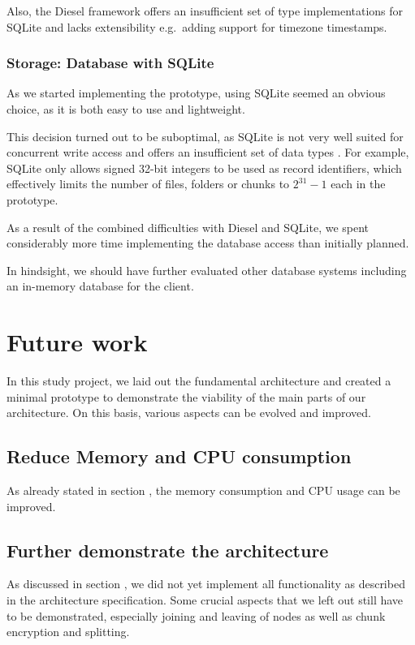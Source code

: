 Also, the Diesel framework offers an insufficient set of type implementations for SQLite and lacks extensibility e.g.~adding support for timezone timestamps.

\subsubsection{Storage: Database with SQLite}
As we started implementing the prototype, using SQLite seemed an obvious choice, as it is both easy to use and lightweight.

This decision turned out to be suboptimal, as SQLite is not very well suited for concurrent write access \cite{sqlite-locking} and offers an insufficient set of data types \cite{sqlite-datatypes}. For example, SQLite only allows signed 32-bit integers to be used as record identifiers, which effectively limits the number of \glspl{file}, folders or \glspl{chunk} to $2^{31}-1$ each in the prototype.

As a result of the combined difficulties with Diesel and SQLite, we spent considerably more time implementing the database access than initially planned.

In hindsight, we should have further evaluated other database systems including an in-memory database for the \gls{client}.

\section{Future work}

In this study project, we laid out the fundamental architecture and created a minimal prototype to demonstrate the viability of the main parts of our architecture. On this basis, various aspects can be evolved and improved.

\subsection{Reduce Memory and CPU consumption}
As already stated in section , the memory consumption and CPU usage can be improved.

\subsection{Further demonstrate the architecture}

As discussed in section , we did not yet implement all functionality as described in the architecture specification. Some crucial aspects that we left out still have to be demonstrated, especially joining and leaving of nodes as well as chunk encryption and splitting.

